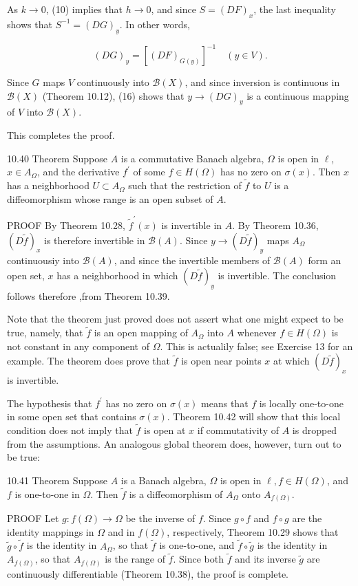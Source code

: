 \documentclass[10pt]{article}
\begin{document}
As $k \rightarrow 0$, (10) implies that $h \rightarrow 0$, and since $S=(D F)_{x}$, the last inequality shows that $S^{-1}=(D G)_{y}$. In other words,

$$
(D G)_{y}=\left[(D F)_{G(y)}\right]^{-1} \quad(y \in V) .
$$

Since $G$ maps $V$ continuously into $\mathscr{B}(X)$, and since inversion is continuous in $\mathscr{B}(X)$ (Theorem 10.12), (16) shows that $y \rightarrow(D G)_{y}$ is a continuous mapping of $V$ into $\mathscr{B}(X)$.

This completes the proof.

10.40 Theorem Suppose $A$ is a commutative Banach algebra, $\Omega$ is open in $\ell$, $x \in A_{\Omega}$, and the derivative $f^{\prime}$ of some $f \in H(\Omega)$ has no zero on $\sigma(x)$. Then $x$ has a neighborhood $U \subset A_{\Omega}$ such that the restriction of $\tilde{f}$ to $U$ is a diffeomorphism whose range is an open subset of $A$.

PROOF By Theorem 10.28, $\tilde{f}^{\prime}(x)$ is invertible in $A$. By Theorem 10.36, $(D \tilde{f})_{x}$ is therefore invertible in $\mathscr{B}(A)$. Since $y \rightarrow(D \tilde{f})_{y}$ maps $A_{\Omega}$ continuousiy into $\mathscr{B}(A)$, and since the invertible members of $\mathscr{B}(A)$ form an open set, $x$ has a neighborhood in which $(D \tilde{f})_{y}$ is invertible. The conclusion follows therefore ,from Theorem 10.39.

Note that the theorem just proved does not assert what one might expect to be true, namely, that $\tilde{f}$ is an open mapping of $A_{\Omega}$ into $A$ whenever $f \in H(\Omega)$ is not constant in any component of $\Omega$. This is actualily false; see Exercise 13 for an example. The theorem does prove that $\tilde{f}$ is open near points $x$ at which $(D \tilde{f})_{x}$ is invertible.

The hypothesis that $f^{\prime}$ has no zero on $\sigma(x)$ means that $f$ is locally one-to-one in some open set that contains $\sigma(x)$. Theorem 10.42 will show that this local condition does not imply that $\tilde{f}$ is open at $x$ if commutativity of $A$ is dropped from the assumptions. An analogous global theorem does, however, turn out to be true:

10.41 Theorem Suppose $A$ is a Banach algebra, $\Omega$ is open in $\ell, f \in H(\Omega)$, and $f$ is one-to-one in $\Omega$. Then $\tilde{f}$ is a diffeomorphism of $A_{\Omega}$ onto $A_{f(\Omega)}$.

PROOF Let $g: f(\Omega) \rightarrow \Omega$ be the inverse of $f$. Since $g \circ f$ and $f \circ g$ are the identity mappings in $\Omega$ and in $f(\Omega)$, respectively, Theorem 10.29 shows that $\tilde{g} \circ \tilde{f}$ is the identity in $A_{\Omega}$, so that $\tilde{f}$ is one-to-one, and $\tilde{f} \circ \tilde{g}$ is the identity in $A_{f(\Omega)}$, so that $A_{f(\Omega)}$ is the range of $\tilde{f}$. Since both $\tilde{f}$ and its inverse $\tilde{g}$ are continuously differentiable (Theorem 10.38), the proof is complete.
\end{document}

